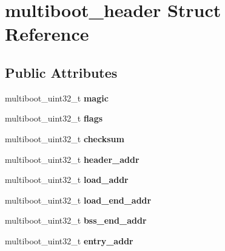 \hypertarget{structmultiboot__header}{}\section{multiboot\+\_\+header Struct Reference}
\label{structmultiboot__header}
\subsection*{Public Attributes}
\begin{DoxyCompactItemize}
\item 
\mbox{\label{structmultiboot__header_a7fddee92e60ff58e159c6bf2c40bf29b}} 
multiboot\+\_\+uint32\+\_\+t {\bfseries magic}
\item 
\mbox{\label{structmultiboot__header_ab922f32c179ec7bde91519d19f27d95b}} 
multiboot\+\_\+uint32\+\_\+t {\bfseries flags}
\item 
\mbox{\label{structmultiboot__header_a17e73abddfe8264c254767a20099038d}} 
multiboot\+\_\+uint32\+\_\+t {\bfseries checksum}
\item 
\mbox{\label{structmultiboot__header_a9718b2fc6ce29a37e9a209f92ab856e3}} 
multiboot\+\_\+uint32\+\_\+t {\bfseries header\+\_\+addr}
\item 
\mbox{\label{structmultiboot__header_a99de1cf326c46c76c6039f317b7a1ef2}} 
multiboot\+\_\+uint32\+\_\+t {\bfseries load\+\_\+addr}
\item 
\mbox{\label{structmultiboot__header_ac9efc1a4c3cd18f286b2fd50ff052e31}} 
multiboot\+\_\+uint32\+\_\+t {\bfseries load\+\_\+end\+\_\+addr}
\item 
\mbox{\label{structmultiboot__header_ab4f2496ec9b0d1a95985929d281dfa19}} 
multiboot\+\_\+uint32\+\_\+t {\bfseries bss\+\_\+end\+\_\+addr}
\item 
\mbox{\label{structmultiboot__header_ac3d807775a9d69730e6698dcdcf6491e}} 
multiboot\+\_\+uint32\+\_\+t {\bfseries entry\+\_\+addr}
\item 

\end{DoxyCompactItemize}
